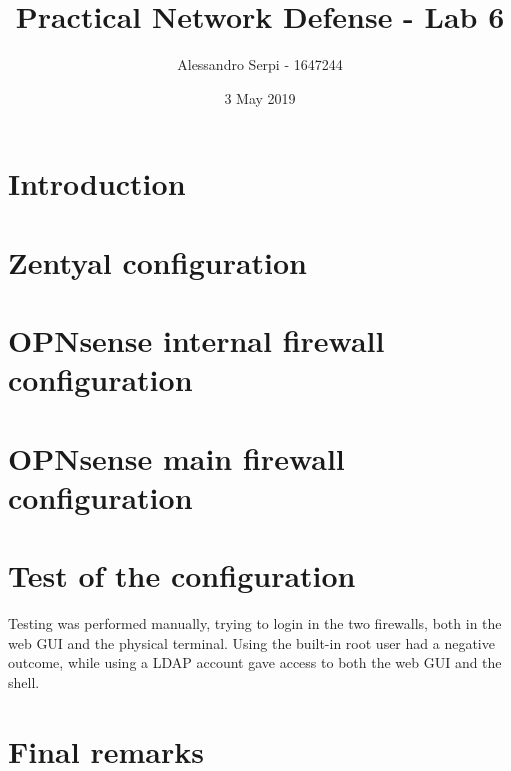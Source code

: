 \documentclass[draft]{homework}
\title{Practical Network Defense - Lab 6}
\author{Alessandro Serpi - 1647244}
\date{3 May 2019}
\newcommand{\opn}{OPNsense\xspace}
\begin{document}
    \maketitle
    \tableofcontents
    
    
    \pagebreak
    \section{Introduction}
    
    
    \section{Zentyal configuration}
    
    
    \section{\opn internal firewall configuration}
    
    
    \section{\opn main firewall configuration}
    
    
    \section{Test of the configuration}
    Testing was performed manually, trying to login in the two firewalls, both in the web GUI and the physical terminal.
    Using the built-in root user had a negative outcome, while using a LDAP account gave access to both the web GUI and the shell.
    
    
    \section{Final remarks}
\end{document}
